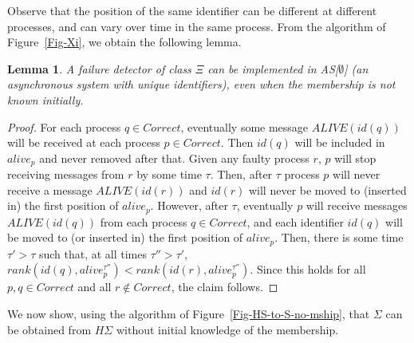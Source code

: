 \documentclass[10pt, conference, compsocconf]{IEEEtran}
\newtheorem{lemma}{Lemma}
\newcommand{\HS}{{H\Sigma}}
\newcommand{\C}{{\mathit{Correct}}}
\begin{document}
Observe that 
the position of the same identifier can be different at different processes, and can vary over time in the same process.
From the algorithm of Figure~\ref{Fig-Xi}, we obtain the following lemma.

\begin{lemma}
\label{l-Xi}
A failure detector of class $\Xi$ can be implemented in AS[$\emptyset$] (an asynchronous system with unique identifiers), even when the membership is not known initially.
\end{lemma}
\begin{proof}
For each process $q \in \C$, eventually some message $\mathit{ALIVE}(id(q))$ will be received at each process $p \in \C$. Then $id(q)$ will be included in $alive_p$ and never removed after that. Given any faulty process $r$, $p$ will stop receiving messages from $r$ by some time $\tau$. Then, after $\tau$ process $p$ will never receive a message $\mathit{ALIVE}(id(r))$ and $id(r)$ will never be moved to (inserted in) the first position of $alive_p$. However, after $\tau$, eventually $p$ will receive messages $\mathit{ALIVE}(id(q))$ from each process $q \in \C$, and each identifier $id(q)$ will be moved to (or inserted in) the first position of $alive_p$. Then, there is some time $\tau' > \tau$ such that, at all times $\tau'' > \tau'$, $rank(id(q), alive_p^{\tau''}) < rank(id(r), alive_p^{\tau''})$. Since this holds for all $p,q \in \C$ and all $r \notin \C$, the claim follows.
\end{proof}

We now show, using the algorithm of  Figure~\ref{Fig-HS-to-S-no-mship}, that $\Sigma$ can be obtained from $\HS$ without initial knowledge of the membership. 
\end{document}

